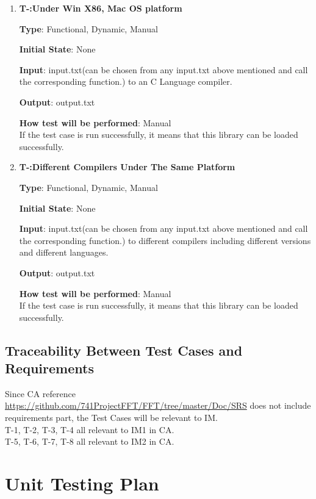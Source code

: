 \documentclass[12pt, titlepage]{article}
\newcounter{tnum}
\begin{document}
\begin{enumerate}

\item{\textbf{T-\thetnum \label{Win86}:Under Win X86, Mac OS platform}}

\textbf {Type}: Functional, Dynamic, Manual
					
\textbf {Initial State}: None
					
\textbf {Input}: input.txt(can be chosen from any input.txt above
mentioned and call the corresponding function.) to an C Language
compiler.
					
\textbf {Output}: output.txt
					
\textbf {How test will be performed}: Manual\\
If the test case is run successfully, it means that this library can be loaded successfully.


\item{\textbf{T-\thetnum \label{Compilers}:Different Compilers Under The Same Platform}}

\textbf {Type}: Functional, Dynamic, Manual
					
\textbf {Initial State}: None
					
\textbf {Input}:  input.txt(can be chosen from any input.txt above mentioned and call the corresponding function.) to different compilers including different versions and different languages.
					
\textbf {Output}: output.txt
					
\textbf {How test will be performed}: Manual\\
If the test case is run successfully, it means that this library can be loaded successfully.
\end{enumerate}


\subsection{Traceability Between Test Cases and Requirements}
Since CA reference \url{https://github.com/741ProjectFFT/FFT/tree/master/Doc/SRS} does not include requirements part, the Test Cases will be relevant to IM.\\
T-1, T-2, T-3, T-4 all relevant to IM1 in CA.\\
T-5, T-6, T-7, T-8 all relevant to IM2 in CA.\\			
\section{Unit Testing Plan}
\end{document}

